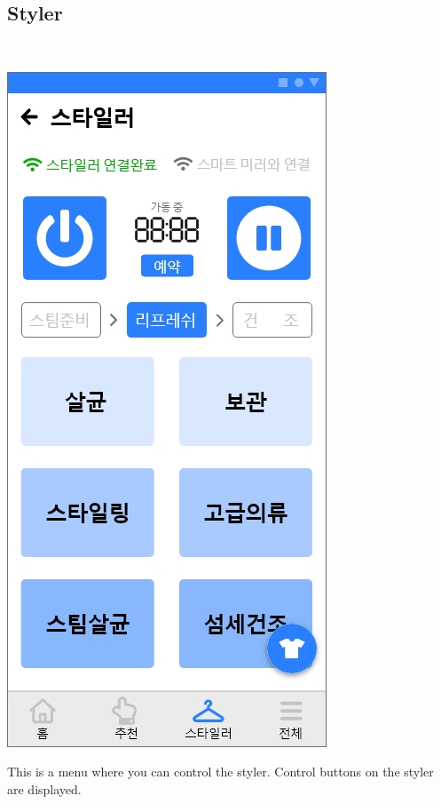 \documentclass[conference]{IEEEtran}
\begin{document}
\subsection{Styler}  \\ 
\centerline{\includegraphics[scale=0.32]{assets/스타일러4.jpg}}
This is a menu where you can control the styler. Control buttons on the styler are displayed. \\ \\ \\ \\
\end{document}

